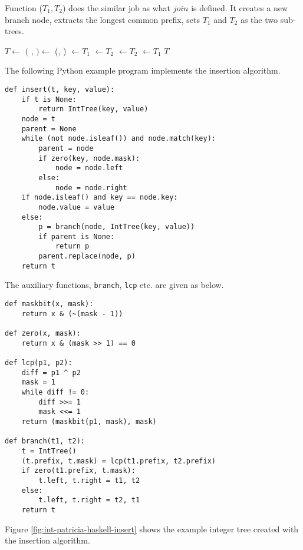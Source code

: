 \documentclass[b5paper]{article}
\begin{document}
Function ($T_1, T_2$) does the similar job as what $join$ is defined.
It creates a new branch node, extracts the longest common prefix, sets $T_1$ and
$T_2$ as the two sub-trees.

\begin{algorithmic}[1]
  \State $T \gets$ 
  \State $($ ,  $) \gets$ (, )
    \State {} $\gets T_1$
    \State {} $\gets T_2$
  \Else
    \State {} $\gets T_2$
    \State {} $\gets T_1$
  \EndIf
  \State \Return $T$
\EndFunction
\end{algorithmic}


The following Python example program implements the insertion algorithm.

\lstset{language=Python}
\begin{lstlisting}
def insert(t, key, value):
    if t is None:
        return IntTree(key, value)
    node = t
    parent = None
    while (not node.isleaf()) and node.match(key):
        parent = node
        if zero(key, node.mask):
            node = node.left
        else:
            node = node.right
    if node.isleaf() and key == node.key:
        node.value = value
    else:
        p = branch(node, IntTree(key, value))
        if parent is None:
            return p
        parent.replace(node, p)
    return t
\end{lstlisting}

The auxiliary functions, \texttt{branch}, \texttt{lcp} etc. are given as below.

\begin{lstlisting}
def maskbit(x, mask):
    return x & (~(mask - 1))

def zero(x, mask):
    return x & (mask >> 1) == 0

def lcp(p1, p2):
    diff = p1 ^ p2
    mask = 1
    while diff != 0:
        diff >>= 1
        mask <<= 1
    return (maskbit(p1, mask), mask)

def branch(t1, t2):
    t = IntTree()
    (t.prefix, t.mask) = lcp(t1.prefix, t2.prefix)
    if zero(t1.prefix, t.mask):
        t.left, t.right = t1, t2
    else:
        t.left, t.right = t2, t1
    return t
\end{lstlisting}

Figure \ref{fig:int-patricia-haskell-insert} shows the example integer tree created
with the insertion algorithm.
\end{document}
